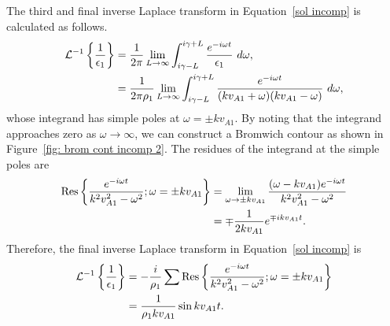 \documentclass[12pt]{../style-files/ociamthesis}
\begin{document}
The third and final inverse Laplace transform in Equation~\eqref{sol incomp} is calculated as follows.
\begin{align}
\mathcal{L}^{-1}\left\{ \frac{1}{\epsilon_1} \right\} &= \frac{1}{2\pi}\lim_{L \to \infty} \int_{i\gamma - L}^{i\gamma + L} \frac{e^{-i\omega t}}{\epsilon_1} ~d\omega, \notag \\
&= \frac{1}{2\pi\rho_1}\lim_{L \to \infty} \int_{i\gamma - L}^{i\gamma + L} \frac{e^{-i\omega t}}{(kv_{A1} + \omega)(kv_{A1} - \omega)} ~d\omega,
\end{align}
whose integrand has simple poles at $\omega = \pm k v_{A1}$. By noting that the integrand approaches zero as $\omega \to \infty$, we can construct a Bromwich contour as shown in Figure~\ref{fig: brom cont incomp 2}. The residues of the integrand at the simple poles are
\begin{align}
\mathrm{Res}\left\{\frac{e^{-i\omega t}}{k^2v_{A1}^2 - \omega^2}; \omega = \pm kv_{A1} \right\} &= 
\lim_{\omega \to \pm kv_{A1}} \frac{(\omega - kv_{A1}) e^{-i\omega t}}{k^2v_{A1}^2 - \omega^2} \notag \\ 
&= \mp \frac{1}{2kv_{A1}} e^{\mp ikv_{A1} t}.
\end{align}
Therefore, the final inverse Laplace transform in Equation~\eqref{sol incomp} is
\begin{align}
\mathcal{L}^{-1}\left\{ \frac{1}{\epsilon_1} \right\} &= -\frac{i}{\rho_1} \sum \mathrm{Res} \left\{ \frac{e^{-i\omega t}}{k^2v_{A1}^2 - \omega^2}; \omega = \pm kv_{A1} \right\} \notag \\
&= \frac{1}{\rho_1kv_{A1}} \sin{kv_{A1}t}.
\end{align}
\end{document}
